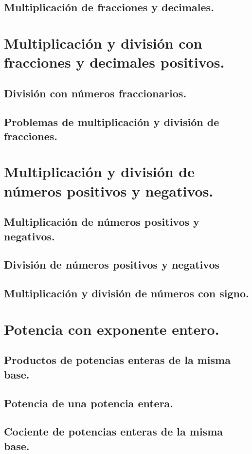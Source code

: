 \documentclass[11pt]{book}
\begin{document}
\subsection{Multiplicación de fracciones y decimales.}

\section{Multiplicación y división con fracciones y decimales positivos.}
\subsection{División con números fraccionarios.}
\subsection{Problemas de multiplicación y división de fracciones.}

\section{Multiplicación y división de números positivos y negativos.}
\subsection{Multiplicación de números positivos y negativos.}
\subsection{División de números positivos y negativos}
\subsection{Multiplicación y división de números con signo.}

\section{Potencia con exponente entero.}
\subsection{Productos de potencias enteras de la misma base.}
\subsection{Potencia de una potencia entera.}
\subsection{Cociente de potencias enteras de la misma base.}
\end{document}
